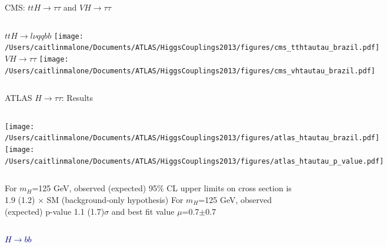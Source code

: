 \documentclass{beamer}
\begin{document}
\begin{frame}{CMS: $ttH\rightarrow\tau\tau$ and $VH\rightarrow\tau\tau$}
	

	\begin{columns}[c]
			$ttH\rightarrow l\nu qq bb$
			\texttt{[image: /Users/caitlinmalone/Documents/ATLAS/HiggsCouplings2013/figures/cms\_tthtautau\_brazil.pdf]}
			$VH\rightarrow\tau\tau$
			\texttt{[image: /Users/caitlinmalone/Documents/ATLAS/HiggsCouplings2013/figures/cms\_vhtautau\_brazil.pdf]}
	\end{columns}
	
\end{frame}



\begin{frame}{ATLAS $H\rightarrow\tau\tau$: Results}
	\begin{columns}[c]
			\texttt{[image: /Users/caitlinmalone/Documents/ATLAS/HiggsCouplings2013/figures/atlas\_htautau\_brazil.pdf]}
			\texttt{[image: /Users/caitlinmalone/Documents/ATLAS/HiggsCouplings2013/figures/atlas\_htautau\_p\_value.pdf]}
	\end{columns}
	
	\begin{columns}[c]
			\scriptsize
			For $m_H$=125 GeV, observed (expected) 95\% CL upper limits on cross section is 1.9 (1.2) $\times$ SM (background-only hypothesis)
			\scriptsize
			For $m_H$=125 GeV, observed (expected) p-value 1.1 (1.7)$\sigma$ and best fit value $\mu$=0.7$\pm$0.7
	\end{columns}
\end{frame}




\begin{frame}[c]
	\begin{center}
	\huge \textcolor{Navy}{$H\rightarrow bb$}
	\end{center}
\end{frame}
\end{document}
